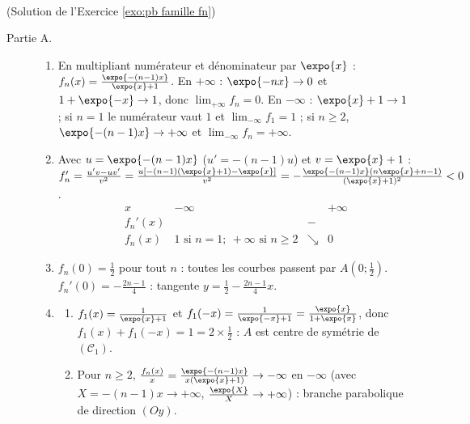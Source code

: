 \begin{corrige}
\begin{sol} ~ \\
(Solution de l'Exercice \ref{exo:pb famille fn})
\begin{description}
\item[Partie A.] \begin{enumerate}
      \item En multipliant num\'erateur et d\'enominateur par $\expo{x}$ : $f_n(x) = \frac{\expo{-(n-1)x}}{\expo{x} + 1}$.
            En $+\infty$ : $\expo{-nx} \to 0$ et $1 + \expo{-x} \to 1$, donc $\lim_{+\infty} f_n = 0$.
            En $-\infty$ : $\expo{x} + 1 \to 1$ ; si $n = 1$ le num\'erateur vaut $1$ et $\lim_{-\infty} f_1 = 1$ ;
            si $n \geq 2$, $\expo{-(n-1)x} \to +\infty$ et $\lim_{-\infty} f_n = +\infty$.
      \item Avec $u = \expo{-(n-1)x}$ ($u' = -(n-1)u$) et $v = \expo{x} + 1$ :
            $f_n' = \frac{u'v - uv'}{v^2} = \frac{u\left[ -(n-1)(\expo{x} + 1) - \expo{x} \right]}{v^2}
            = -\frac{\expo{-(n-1)x}\left( n\expo{x} + n - 1 \right)}{(\expo{x} + 1)^2} < 0$.
            \[
            \begin{array}{c|ccc}
            x & -\infty & & +\infty \\ \hline
            f_n'(x) & & - & \\ \hline
            f_n(x) & 1 \text{ si } n = 1 ;\ +\infty \text{ si } n \geq 2 & \searrow & 0
            \end{array}
            \]
      \item $f_n(0) = \frac{1}{2}$ pour tout $n$ : toutes les courbes passent par $\boxed{A\left(0 ; \frac{1}{2}\right)}$.
            $f_n'(0) = -\frac{2n - 1}{4}$ : tangente $y = \frac{1}{2} - \frac{2n - 1}{4}x$.
      \item \begin{enumerate}
            \item $f_1(x) = \frac{1}{\expo{x} + 1}$ et $f_1(-x) = \frac{1}{\expo{-x} + 1} = \frac{\expo{x}}{1 + \expo{x}}$, donc
                  $f_1(x) + f_1(-x) = 1 = 2 \times \frac{1}{2}$ : $A$ est centre de sym\'etrie de $(\mathscr{C}_1)$.
            \item Pour $n \geq 2$, $\frac{f_n(x)}{x} = \frac{\expo{-(n-1)x}}{x(\expo{x} + 1)} \to -\infty$ en $-\infty$
                  (avec $X = -(n-1)x \to +\infty$, $\frac{\expo{X}}{X} \to +\infty$) : branche parabolique de direction $(Oy)$.
            \end{enumerate}

\end{enumerate}
\end{description}
\end{sol}
\end{corrige}

